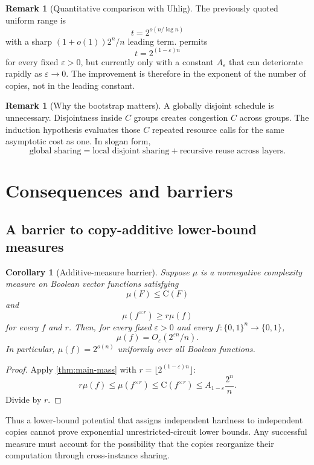 \documentclass[11pt]{article}
\newtheorem{corollary}[theorem]{Corollary}
\theoremstyle{definition}
\newtheorem{remark}[theorem]{Remark}
\newcommand{\bits}{\{0,1\}}
\newcommand{\C}{\mathrm{C}}
\newcommand{\eps}{\varepsilon}
\begin{document}
\begin{remark}[Quantitative comparison with Uhlig]
The previously quoted uniform range is
\[
 t=2^{o(n/\log n)}
\]
with a sharp $(1+o(1))2^n/n$ leading term.   permits
\[
 t=2^{(1-\eps)n}
\]
for every fixed $\eps>0$, but currently only with a constant $A_\eps$ that can deteriorate rapidly as $\eps\to0$.  The improvement is therefore in the exponent of the number of copies, not in the leading constant.
\end{remark}

\begin{remark}[Why the bootstrap matters]
A globally disjoint schedule is unnecessary.  Disjointness inside $C$ groups creates congestion $C$ across groups.  The induction hypothesis evaluates those $C$ repeated resource calls for the same asymptotic cost as one.  In slogan form,
\[
 \text{global sharing}
 =\text{local disjoint sharing}+\text{recursive reuse across layers}.
\]
\end{remark}

\section{Consequences and barriers}

\subsection{A barrier to copy-additive lower-bound measures}

\begin{corollary}[Additive-measure barrier]\label{cor:additive-barrier}
Suppose $\mu$ is a nonnegative complexity measure on Boolean vector functions satisfying
\[
 \mu(F)\le\C(F)
\]
and
\[
 \mu(f^{\times r})\ge r\mu(f)
\]
for every $f$ and $r$.  Then, for every fixed $\eps>0$ and every $f:\bits^n\to\bits$,
\[
 \mu(f)=O_\eps(2^{\eps n}/n).
\]
In particular, $\mu(f)=2^{o(n)}$ uniformly over all Boolean functions.
\end{corollary}

\begin{proof}
Apply \cref{thm:main-mass} with $r=\lfloor2^{(1-\eps)n}\rfloor$:
\[
 r\mu(f)\le\mu(f^{\times r})\le\C(f^{\times r})
   \le A_{1-\eps}\frac{2^n}{n}.
\]
Divide by $r$.
\end{proof}

Thus a lower-bound potential that assigns independent hardness to independent copies cannot prove exponential unrestricted-circuit lower bounds.  Any successful measure must account for the possibility that the copies reorganize their computation through cross-instance sharing.
\end{document}
